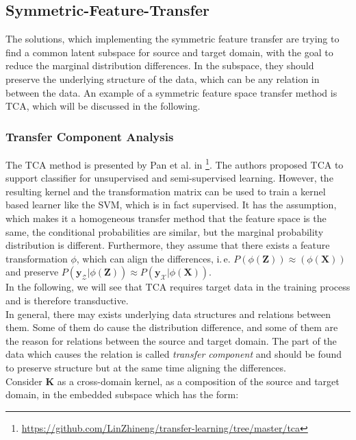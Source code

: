 \subsection{Symmetric-Feature-Transfer}\label{TlSubSecHomoSymFeature}
The solutions, which implementing the symmetric feature transfer are trying to find a common latent subspace for source and target domain, with the goal to reduce the marginal distribution differences.
In the subspace, they should preserve the underlying structure of the data, which can be any relation in between the data.
An example of a symmetric feature space transfer method is \ac{TCA}, which will be discussed in the following.\cite[p. 6]{Weiss.2016}
\subsubsection{Transfer Component Analysis}
The \acs{TCA} method is presented by Pan et al. in \cite{Pan.2011}\footnote{\url{https://github.com/LinZhineng/transfer-learning/tree/master/tca}}.
The authors proposed \acs{TCA} to support classifier for unsupervised and semi-supervised learning.\cite{Pan.2011}
However, the resulting kernel and the transformation matrix can be used to train a kernel based learner like the \acs{SVM}, which is in fact supervised.
It has the assumption, which makes it a homogeneous transfer method that the feature space is the same, the conditional probabilities are similar, but the marginal probability distribution is different.
Furthermore, they assume that there exists a feature transformation $\phi$, which can align the differences, i.\,e. $P(\phi(\mathbf{Z})) \approx(\phi(\mathbf{X}))$ and preserve $P(\mathbf{y}_\mathcal{Z}\vert \phi(\mathbf{Z}))\approx P(\mathbf{y}_\mathcal{X}\vert \phi(\mathbf{X}))$.\cite{Pan.2011}\\
In the following, we will see that \acs{TCA} requires target data in the training process and is therefore transductive.\\
In general, there may exists underlying data structures and relations between them.
Some of them do cause the distribution difference, and some of them are the reason for relations between the source and target domain.
The part of the data which causes the relation is called \textit{transfer component} and should be found to preserve structure but at the same time aligning the differences.\cite{Pan.2011}\\
Consider $\mathbf{K}$ as a cross-domain kernel, as a composition of the source and target domain, in the embedded subspace which has the form:\cite{Pan.2011}
